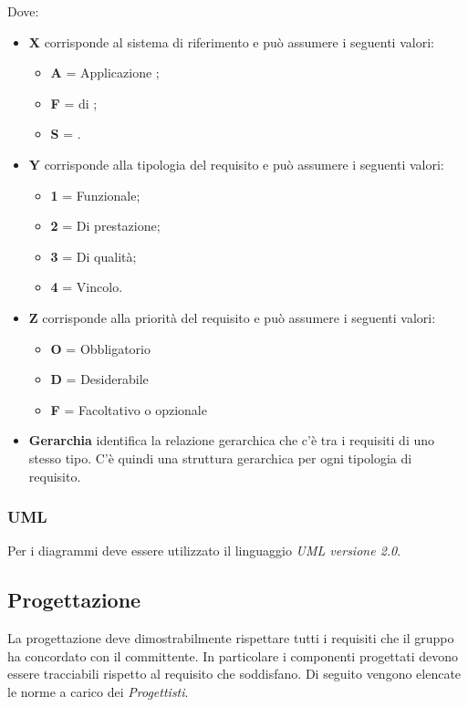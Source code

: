 Dove:
\begin{itemize}
 \item \textbf{X} corrisponde al sistema di riferimento e può assumere i seguenti valori:
    \begin{itemize}
     \item[] \textbf{A} = Applicazione ;
     \item[] \textbf{F} =  di ;
     \item[] \textbf{S} = .
    \end{itemize}

 \item \textbf{Y} corrisponde alla tipologia del requisito e può assumere i seguenti valori:
    \begin{itemize}
     \item[] \textbf{1} = Funzionale;
     \item[] \textbf{2} = Di prestazione;
     \item[] \textbf{3} = Di qualità;
     \item[] \textbf{4} = Vincolo.
    \end{itemize}

 \item \textbf{Z} corrisponde alla priorità del requisito e può assumere i seguenti valori:
    \begin{itemize}
     \item[] \textbf{O} = Obbligatorio
     \item[] \textbf{D} = Desiderabile
     \item[] \textbf{F} = Facoltativo o opzionale
    \end{itemize}

 \item \textbf{Gerarchia} identifica la relazione gerarchica che c'è tra i requisiti di uno stesso tipo. C'è quindi una struttura gerarchica per ogni tipologia di requisito.
\end{itemize}

\subsubsection{UML}

Per i diagrammi deve essere utilizzato il linguaggio \emph{UML versione 2.0}.


\subsection{Progettazione}
La progettazione deve dimostrabilmente rispettare tutti i requisiti che il gruppo ha concordato con il committente. In particolare i componenti progettati devono essere tracciabili rispetto al requisito che soddisfano.
Di seguito vengono elencate le norme a carico dei \emph{Progettisti}.


